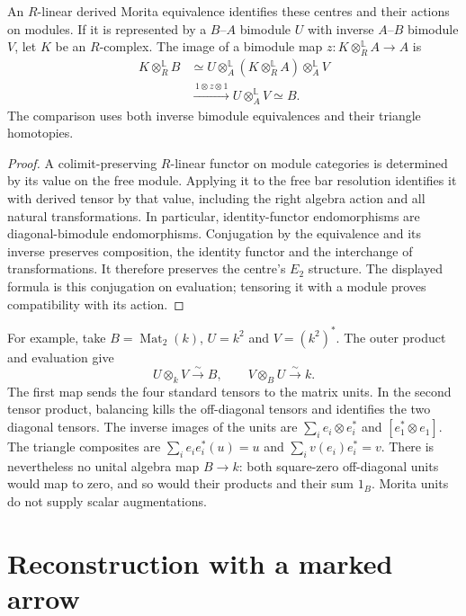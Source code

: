 \begin{proposition}\label{prop:vol2-morita-centre-transport}
An \(R\)-linear derived Morita equivalence identifies these
centres and their actions on modules. If it is represented by
a \(B\)--\(A\) bimodule \(U\) with inverse \(A\)--\(B\)
bimodule \(V\), let \(K\) be an \(R\)-complex. The image of
a bimodule map \(z:K\otimes_R^{\mathbb L}A\to A\) is
\[
 \begin{aligned}
 K\otimes_R^{\mathbb L} B
 &\simeq U\otimes_A^{\mathbb L}
       (K\otimes_R^{\mathbb L} A)\otimes_A^{\mathbb L}V\\
 &\xrightarrow{\,1\otimes z\otimes1\,}
 U\otimes_A^{\mathbb L}V\simeq B.
 \end{aligned}
\]
The comparison uses both inverse bimodule equivalences and
their triangle homotopies.
\end{proposition}
\begin{proof}
A colimit-preserving \(R\)-linear functor on module categories
is determined by its value on the free module. Applying it to
the free bar resolution identifies it with derived tensor by
that value, including the right algebra action and all natural
transformations. In particular, identity-functor endomorphisms
are diagonal-bimodule endomorphisms. Conjugation by the
equivalence and its inverse preserves composition, the
identity functor and the interchange of transformations.
It therefore preserves the centre's \(E_2\) structure.
The displayed formula is this conjugation on evaluation;
tensoring it with a module proves compatibility with its action.
\end{proof}

For example, take \(B=\operatorname{Mat}_2(k)\), \(U=k^2\)
and \(V=(k^2)^*\). The outer product and evaluation give
\[
 U\otimes_k V\xrightarrow{\sim}B,\qquad
 V\otimes_B U\xrightarrow{\sim}k.
\]
The first map sends the four standard tensors to the matrix
units. In the second tensor product, balancing kills the
off-diagonal tensors and identifies the two diagonal tensors.
The inverse images of the units are
\(\sum_i e_i\otimes e_i^*\) and \([e_1^*\otimes e_1]\).
The triangle composites are
\(\sum_i e_i e_i^*(u)=u\) and
\(\sum_i v(e_i)e_i^*=v\).
There is nevertheless no unital algebra map \(B\to k\):
both square-zero off-diagonal units would map to zero,
and so would their products and their sum \(1_B\).
Morita units do not supply scalar augmentations.

\section{Reconstruction with a marked arrow}
\label{sec:vol2-arrow-reconstruction}

